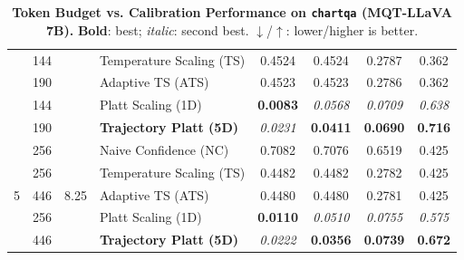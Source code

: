 \begin{table}[t]
\begin{tabular}{ccclcccc}
 & 144 &  & Temperature Scaling (TS) & 0.4524 & 0.4524 & 0.2787 & 0.362 \\
 & 190 &  & Adaptive TS (ATS) & 0.4523 & 0.4523 & 0.2786 & 0.362 \\
 & 144 &  & Platt Scaling (1D) & \textbf{0.0083} & \textit{0.0568} & \textit{0.0709} & \textit{0.638} \\
 & 190 &  & \textbf{Trajectory Platt (5D)} & \textit{0.0231} & \textbf{0.0411} & \textbf{0.0690} & \textbf{0.716} \\
\midrule
\multirow{5}{*}{5} & 256 & \multirow{5}{*}{8.25} & Naive Confidence (NC) & 0.7082 & 0.7076 & 0.6519 & 0.425 \\
 & 256 &  & Temperature Scaling (TS) & 0.4482 & 0.4482 & 0.2782 & 0.425 \\
 & 446 &  & Adaptive TS (ATS) & 0.4480 & 0.4480 & 0.2781 & 0.425 \\
 & 256 &  & Platt Scaling (1D) & \textbf{0.0110} & \textit{0.0510} & \textit{0.0755} & \textit{0.575} \\
 & 446 &  & \textbf{Trajectory Platt (5D)} & \textit{0.0222} & \textbf{0.0356} & \textbf{0.0739} & \textbf{0.672} \\
\bottomrule
\end{tabular}
\caption{\textbf{Token Budget vs. Calibration Performance on \texttt{chartqa} (MQT-LLaVA 7B).} \textbf{Bold}: best; \textit{italic}: second best. $\downarrow$/$\uparrow$: lower/higher is better.}
\label{tab:token_budget_chartqa_mqt}
\end{table}

